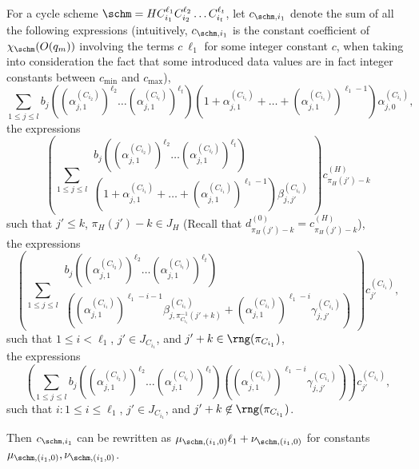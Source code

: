 For a cycle scheme $\schm=HC_{i_1}^{\ell_1} C_{i_2}^{\ell_2} \dots C_{i_t}^{\ell_t}$, let $c_{\schm,i_1}$ denote the sum of all the following expressions (intuitively, $c_{\schm,i_1}$ is the constant coefficient of $\chi_\schm(O(q_m))$ involving the terms $ c\ \ell_1$ for some integer constant $c$, when taking into consideration the fact that some introduced data values are in fact integer constants between $c_{\min}$ and $c_{\max}$),
\[
\sum \limits_{1 \le j \le l} 
b_j \left((\alpha^{(C_{i_2})}_{j,1})^{\ell_2} \dots (\alpha^{(C_{i_t})}_{j,1})^{\ell_t}\right) 
\left(1+\alpha^{(C_{i_1})}_{j,1} + \dots + (\alpha^{(C_{i_1})}_{j,1})^{\ell_1-1} \right) \alpha^{(C_{i_1})}_{j,0},
\]
the expressions 
\[
\left(\sum \limits_{1 \le j \le l} 
\begin{array}{l}
b_j \left((\alpha^{(C_{i_2})}_{j,1})^{\ell_2} \dots (\alpha^{(C_{i_t})}_{j,1})^{\ell_t}\right) \\
\left(1+\alpha^{(C_{i_1})}_{j,1} + \dots + (\alpha^{(C_{i_1})}_{j,1})^{\ell_1-1} \right) \beta^{(C_{i_1})}_{j,j'}
\end{array}
\right) c^{(H)}_{\pi_H(j')-k}
\]
such that $j' \le k$, $\pi_H(j')-k \in J_H$ (Recall that $d^{(0)}_{\pi_H(j')-k}=c^{(H)}_{\pi_H(j')-k}$), \\
the expressions
\[
\left(\sum \limits_{1 \le j \le l} 
\begin{array}{l}
b_j \left((\alpha^{(C_{i_2})}_{j,1})^{\ell_2} \dots (\alpha^{(C_{i_t})}_{j,1})^{\ell_t}\right) \\
\left((\alpha^{(C_{i_1})}_{j,1})^{\ell_1-i-1} \beta^{(C_{i_1})}_{j,\pi^{-1}_{C_{i_1}}(j'+k)} + (\alpha^{(C_{i_1})}_{j,1})^{\ell_1-i} \gamma^{(C_{i_1})}_{j,j'}\right)
\end{array}
\right) c^{(C_{i_1})}_{j'},
\]
such that $1 \le i < \ell_1$, $j' \in J_{C_{i_1}}$, and $j'+k \in \rng(\pi_{C_{i_1}})$,\\
the expressions
\[
\left(\sum \limits_{1 \le j \le l} 
b_j \left((\alpha^{(C_{i_2})}_{j,1})^{\ell_2} \dots (\alpha^{(C_{i_t})}_{j,1})^{\ell_t}\right)  \left( (\alpha^{(C_{i_1})}_{j,1})^{\ell_1-i} \gamma^{(C_{i_1})}_{j,j'}\right)
\right) c^{(C_{i_1})}_{j'},
\]
such that $i: 1 \le i \le \ell_1$, $j' \in J_{C_{i_1}}$, and $j'+k \not \in \rng(\pi_{C_{i_1}})$.

Then $c_{\schm,i_1}$ can be rewritten as $\mu_{\schm, (i_1,0)} \ell_1 + \nu_{\schm, (i_1,0)}$ for constants $\mu_{\schm, (i_1,0)},\nu_{\schm, (i_1,0)}$.

